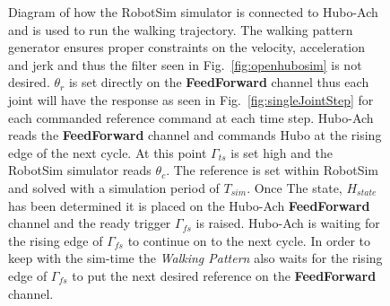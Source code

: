 \begin{figure}
\caption{Diagram of how the RobotSim simulator is connected to Hubo-Ach and is used to run the walking trajectory.  
The walking pattern generator ensures proper constraints on the velocity, acceleration and jerk and thus the filter seen in Fig.~\ref{fig:openhubosim} is not desired.  
$\theta_r$ is set directly on the \textbf{FeedForward} channel thus each joint will have the response as seen in Fig.~\ref{fig:singleJointStep} for each commanded reference command at each time step.
Hubo-Ach reads the \textbf{FeedForward} channel and commands Hubo at the rising edge of the next cycle.  
At this point $\Gamma_{ts}$ is set high and the RobotSim simulator reads $\theta_c$.  
The reference is set within RobotSim and solved with a simulation period of $T_{sim}$.  
Once The state, $H_{state}$ has been determined it is placed on the Hubo-Ach \textbf{FeedForward} channel and the ready trigger $\Gamma_{fs}$ is raised.  
Hubo-Ach is waiting for the rising edge of $\Gamma_{fs}$ to continue on to the next cycle.  
In order to keep with the sim-time the \textit{Walking Pattern} also waits for the rising edge of $\Gamma_{fs}$ to put the next desired reference on the \textbf{FeedForward} channel.}
\label{fig:RobotSimWalking}
\end{figure}

